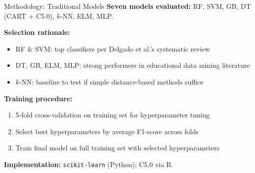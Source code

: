 \documentclass[aspectratio=169]{beamer}
\begin{document}
\begin{frame}{Methodology: Traditional Models}
\textbf{Seven models evaluated:} RF, SVM, GB, DT (CART + C5.0), $k$-NN, ELM, MLP.

\vspace{0.3cm}
\textbf{Selection rationale:}
\begin{itemize}
    \item RF \& SVM: top classifiers per Delgado et al.'s systematic review
    \item DT, GB, ELM, MLP: strong performers in educational data mining literature
    \item $k$-NN: baseline to test if simple distance-based methods suffice
\end{itemize}

\vspace{0.3cm}
\textbf{Training procedure:}
\begin{enumerate}
    \item 5-fold cross-validation on training set for hyperparameter tuning
    \item Select best hyperparameters by average F1-score across folds
    \item Train final model on full training set with selected hyperparameters
\end{enumerate}

\vspace{0.2cm}
\textbf{Implementation:} \texttt{scikit-learn} (Python); C5.0 via R.
\end{frame}
\end{document}
